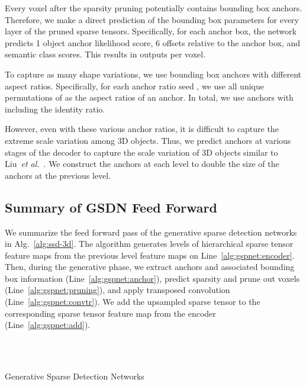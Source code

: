 \documentclass[runningheads]{llncs}
\newcommand{\etal}{\textit{et al.}}
\begin{document}
Every voxel after the sparsity pruning potentially contains bounding box anchors. Therefore, we make a direct prediction of the bounding box parameters for every layer of the pruned sparse tensors. Specifically, for each  anchor box, the network predicts 1 object anchor likelihood score, 6 offsets relative to the anchor box, and  semantic class scores. This results in  outputs per voxel.

To capture as many shape variations, we use bounding box anchors with different aspect ratios. Specifically, for each anchor ratio seed , we use all unique permutations of  as the aspect ratios of an anchor. In total, we use  anchors with  including the identity ratio.

However, even with these various anchor ratios, it is difficult to capture the extreme scale variation among 3D objects. Thus, we predict anchors at various stages of the decoder to capture the scale variation of 3D objects similar to Liu~\etal~\cite{liu2016ssd}. We construct the anchors at each level to double the size of the anchors at the previous level.



\subsection{Summary of GSDN Feed Forward}

We summarize the feed forward pass of the generative sparse detection networks in Alg.~\ref{alg:ssd-3d}. The algorithm generates  levels of hierarchical sparse tensor feature maps from the previous level feature maps on Line~\ref{alg:gspnet:encoder}. Then, during the generative phase, we extract anchors and associated bounding box information (Line~\ref{alg:gspnet:anchor}), predict sparsity and prune out voxels (Line~\ref{alg:gspnet:pruning}), and apply transposed convolution (Line~\ref{alg:gspnet:convtr}). We add the upsampled sparse tensor to the corresponding sparse tensor feature map from the encoder (Line~\ref{alg:gspnet:add}).

\begin{algorithm}[t]
\DontPrintSemicolon
\KwInput{}
\KwOutput{}
    \\
    \For{}
    {
           \label{alg:gspnet:encoder}
    }
     \\
\For{}
    {
        \If{}
        {
              \label{alg:gspnet:add}
        }
          \label{alg:gspnet:anchor}
          \label{alg:gspnet:pruning}
\If{}
        {
               \label{alg:gspnet:convtr}
        }
    }
    \Return 
\caption{Generative Sparse Detection Networks}\label{alg:ssd-3d}
\end{algorithm}
\end{document}
